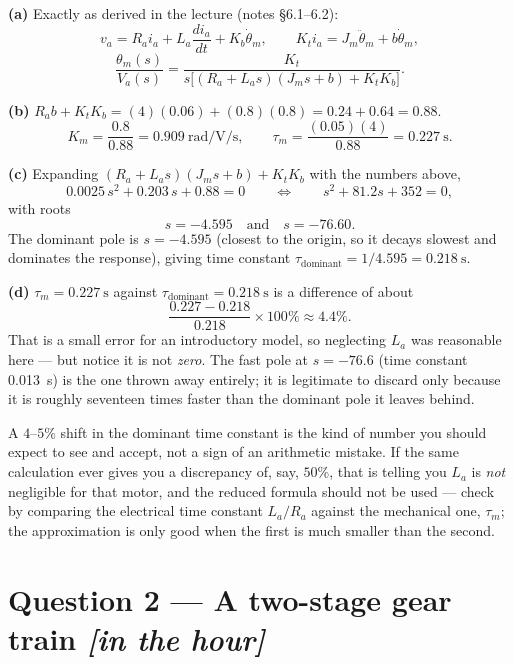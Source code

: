 \documentclass[11pt,a4paper]{article}
\newcommand{\inhour}{\hfill{\small\color{faccent}\itshape[in the hour]}}
\begin{document}
\begin{solution}
\textbf{(a)} Exactly as derived in the lecture (notes \S6.1--6.2):
\[
  v_a=R_ai_a+L_a\frac{di_a}{dt}+K_b\dot\theta_m,
  \qquad
  K_ti_a=J_m\ddot\theta_m+b\dot\theta_m,
\]
\[
  \frac{\theta_m(s)}{V_a(s)}=\frac{K_t}{s\big[(R_a+L_as)(J_ms+b)+K_tK_b\big]}.
\]

\medskip
\textbf{(b)} $R_ab+K_tK_b=(4)(0.06)+(0.8)(0.8)=0.24+0.64=0.88$.
\[
  K_m=\frac{0.8}{0.88}=\SI{0.909}{\radian\per\volt\per\second},
  \qquad
  \tau_m=\frac{(0.05)(4)}{0.88}=\SI{0.227}{\second}.
\]

\medskip
\textbf{(c)} Expanding $(R_a+L_as)(J_ms+b)+K_tK_b$ with the numbers above,
\[
  0.0025\,s^2+0.203\,s+0.88=0
  \qquad\Longleftrightarrow\qquad
  s^2+81.2s+352=0,
\]
with roots
\[
  s=-4.595 \quad\text{and}\quad s=-76.60 .
\]
The dominant pole is $s=-4.595$ (closest to the origin, so it decays slowest
and dominates the response), giving time constant
$\tau_{\text{dominant}}=1/4.595=\SI{0.218}{\second}$.

\medskip
\textbf{(d)} $\tau_m=\SI{0.227}{\second}$ against
$\tau_{\text{dominant}}=\SI{0.218}{\second}$ is a difference of about
\[
  \frac{0.227-0.218}{0.218}\times100\%\approx4.4\%.
\]
That is a small error for an introductory model, so neglecting $L_a$ was
reasonable here --- but notice it is not \emph{zero}. The fast pole at
$s=-76.6$ (time constant \SI{0.013}{\second}) is the one thrown away entirely;
it is legitimate to discard only because it is roughly seventeen times faster
than the dominant pole it leaves behind.
\end{solution}

\begin{pitfall}
A $4$--$5\%$ shift in the dominant time constant is the kind of number you
should expect to see and accept, not a sign of an arithmetic mistake. If the
same calculation ever gives you a discrepancy of, say, $50\%$, that is telling
you $L_a$ is \emph{not} negligible for that motor, and the reduced formula
should not be used --- check by comparing the electrical time constant
$L_a/R_a$ against the mechanical one, $\tau_m$; the approximation is only good
when the first is much smaller than the second.
\end{pitfall}

\section*{Question 2 --- A two-stage gear train \inhour}
\end{document}
